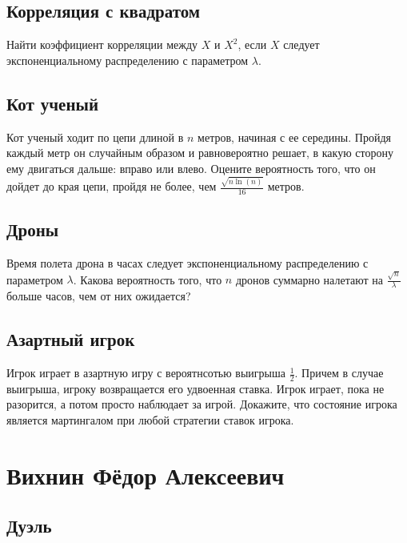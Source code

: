 \documentclass[12pt]{article}
\begin{document}
\subsection{Корреляция с квадратом}

Найти коэффициент корреляции между $X$ и $X^2$, если $X$ следует экспоненциальному распределению с параметром $\lambda$.



\subsection{Кот ученый}

Кот ученый ходит по цепи длиной в $n$ метров, начиная с ее середины. Пройдя каждый метр он случайным образом и равновероятно решает, в какую сторону ему двигаться дальше: вправо или влево. Оцените вероятность того, что он дойдет до края цепи, пройдя не более, чем $\frac{\sqrt{n \ln(n)}}{16}$ метров.



\subsection{Дроны}

Время полета дрона в часах следует экспоненциальному распределению с параметром $\lambda$. Какова вероятность того, что $n$ дронов суммарно налетают на $\frac{\sqrt{n}}{\lambda}$ больше часов, чем от них ожидается?



\subsection{Азартный игрок}

Игрок играет в азартную игру с вероятнсотью выигрыша $\frac{1}{2}$. Причем в случае выигрыша, игроку возвращается его удвоенная ставка. Игрок играет, пока не разорится, а потом просто наблюдает за игрой. Докажите, что состояние игрока является мартингалом при любой стратегии ставок игрока.



\newpage
\section{Вихнин Фёдор Алексеевич}

\subsection{Дуэль}
\end{document}
